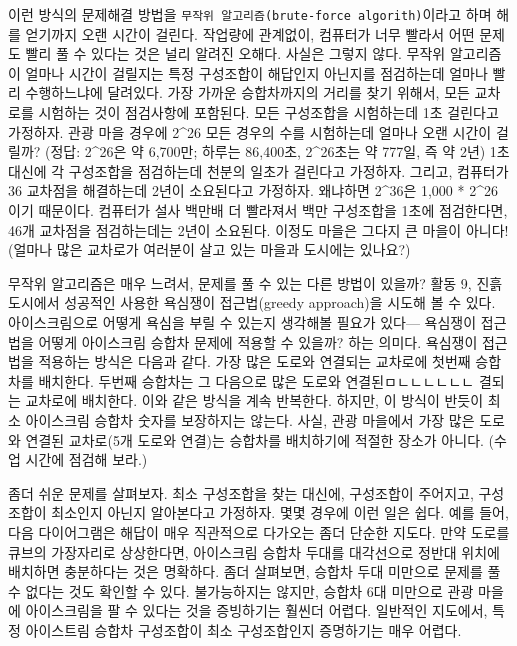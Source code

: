 \documentclass[]{article}
\begin{document}
이런 방식의 문제해결 방법을
\texttt{무작위 알고리즘(brute-force algorith)}이라고 하며 해를 얻기까지
오랜 시간이 걸린다. 작업량에 관계없이, 컴퓨터가 너무 빨라서 어떤 문제도
빨리 풀 수 있다는 것은 널리 알려진 오해다. 사실은 그렇지 않다. 무작위
알고리즘이 얼마나 시간이 걸릴지는 특정 구성조합이 해답인지 아닌지를
점검하는데 얼마나 빨리 수행하느냐에 달려있다. 가장 가까운 승합차까지의
거리를 찾기 위해서, 모든 교차로를 시험하는 것이 점검사항에 포함된다.
모든 구성조합을 시험하는데 1초 걸린다고 가정하자. 관광 마을 경우에
2\^{}26 모든 경우의 수를 시험하는데 얼마나 오랜 시간이 걸릴까? (정답:
2\^{}26은 약 6,700만; 하루는 86,400초, 2\^{}26초는 약 777일, 즉 약 2년)
1초 대신에 각 구성조합을 점검하는데 천분의 일초가 걸린다고 가정하자.
그리고, 컴퓨터가 36 교차점을 해결하는데 2년이 소요된다고 가정하자.
왜냐하면 2\^{}36은 1,000 * 2\^{}26 이기 때문이다. 컴퓨터가 설사 백만배
더 빨라져서 백만 구성조합을 1초에 점검한다면, 46개 교차점을 점검하는데는
2년이 소요된다. 이정도 마을은 그다지 큰 마을이 아니다! (얼마나 많은
교차로가 여러분이 살고 있는 마을과 도시에는 있나요?)

무작위 알고리즘은 매우 느려서, 문제를 풀 수 있는 다른 방법이 있을까?
활동 9, 진흙도시에서 성공적인 사용한 욕심쟁이 접근법(greedy approach)을
시도해 볼 수 있다. 아이스크림으로 어떻게 욕심을 부릴 수 있는지 생각해볼
필요가 있다--- 욕심쟁이 접근법을 어떻게 아이스크림 승합차 문제에 적용할
수 있을까? 하는 의미다. 욕심쟁이 접근법을 적용하는 방식은 다음과 같다.
가장 많은 도로와 연결되는 교차로에 첫번째 승합차를 배치한다. 두번째
승합차는 그 다음으로 많은 도로와 연결된ㅁㄴㄴㄴㄴㄴㄴ 결되는 교차로에
배치한다. 이와 같은 방식을 계속 반복한다. 하지만, 이 방식이 반듯이 최소
아이스크림 승합차 숫자를 보장하지는 않는다. 사실, 관광 마을에서 가장
많은 도로와 연결된 교차로(5개 도로와 연결)는 승합차를 배치하기에 적절한
장소가 아니다. (수업 시간에 점검해 보라.)

좀더 쉬운 문제를 살펴보자. 최소 구성조합을 찾는 대신에, 구성조합이
주어지고, 구성조합이 최소인지 아닌지 알아본다고 가정하자. 몇몇 경우에
이런 일은 쉽다. 예를 들어, 다음 다이어그램은 해답이 매우 직관적으로
다가오는 좀더 단순한 지도다. 만약 도로를 큐브의 가장자리로 상상한다면,
아이스크림 승합차 두대를 대각선으로 정반대 위치에 배치하면 충분하다는
것은 명확하다. 좀더 살펴보면, 승합차 두대 미만으로 문제를 풀 수 없다는
것도 확인할 수 있다. 불가능하지는 않지만, 승합차 6대 미만으로 관광
마을에 아이스크림을 팔 수 있다는 것을 증빙하기는 훨씬더 어렵다. 일반적인
지도에서, 특정 아이스트림 승합차 구성조합이 최소 구성조합인지 증명하기는
매우 어렵다.
\end{document}
